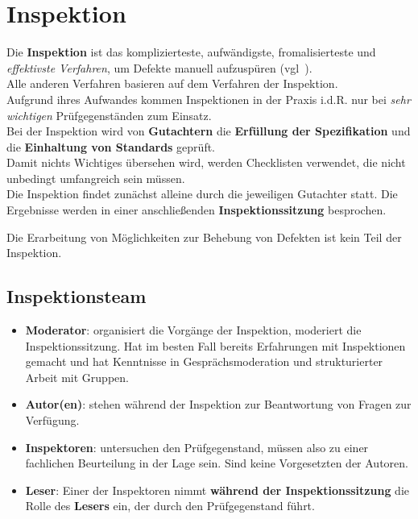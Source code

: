 \section{Inspektion}
Die \textbf{Inspektion} ist das komplizierteste, aufwändigste, fromalisierteste und \textit{effektivste Verfahren}, um Defekte manuell aufzuspüren (vgl~\cite[18]{Wed09c}).\\
Alle anderen Verfahren basieren auf dem Verfahren der Inspektion.\\

\noindent
Aufgrund ihres Aufwandes kommen Inspektionen in der Praxis i.d.R. nur bei \textit{sehr wichtigen} Prüfgegenständen zum Einsatz.\\

\noindent
Bei der Inspektion wird von \textbf{Gutachtern} die \textbf{Erfüllung der Spezifikation} und die \textbf{Einhaltung von Standards} geprüft.\\
Damit nichts Wichtiges übersehen wird, werden Checklisten verwendet, die nicht unbedingt umfangreich sein müssen.\\
Die Inspektion findet zunächst alleine durch die jeweiligen Gutachter statt.
Die Ergebnisse werden in einer anschließenden \textbf{Inspektionssitzung} besprochen.

\begin{tcolorbox}[colback=white]
    Die Erarbeitung von Möglichkeiten zur Behebung von Defekten ist kein Teil der Inspektion.
\end{tcolorbox}

\subsection{Inspektionsteam}

\begin{itemize}
    \item \textbf{Moderator}: organisiert die Vorgänge der Inspektion, moderiert die Inspektionssitzung.
    Hat im besten Fall bereits Erfahrungen mit Inspektionen gemacht und hat Kenntnisse in Gesprächsmoderation und strukturierter Arbeit mit Gruppen.
    \item \textbf{Autor(en)}: stehen während der Inspektion zur Beantwortung von Fragen zur Verfügung.
    \item \textbf{Inspektoren}: untersuchen den Prüfgegenstand, müssen also zu einer fachlichen Beurteilung in der Lage sein. Sind keine Vorgesetzten der Autoren.
    \item \textbf{Leser}: Einer der Inspektoren nimmt \textbf{während der Inspektionssitzung} die Rolle des \textbf{Lesers} ein, der durch den Prüfgegenstand führt.
\end{itemize}

